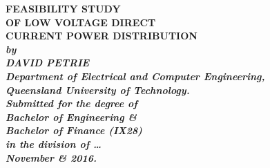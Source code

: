 \begin{titlepage}
\renewcommand{\baselinestretch}{1.0}
\begin{center}
\vspace*{35mm}
\Huge\bf
		FEASIBILITY STUDY\\
		OF LOW VOLTAGE DIRECT\\
		CURRENT POWER DISTRIBUTION\\
\vspace{20mm}
\large\sl
		by\\
		DAVID PETRIE
		\medskip\\
\rm
		Department of Electrical and Computer Engineering,\\
		Queensland University of Technology.\\
\vspace{30mm}
		Submitted for the degree of\\
		Bachelor of Engineering \& \\
		Bachelor of Finance (IX28)
		\smallskip\\ [2cm]
\normalsize
		in the division of \ldots
		\medskip\\
\large
		November \& 2016.		
\end{center}
\end{titlepage}